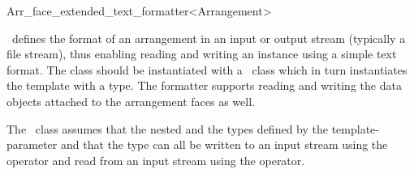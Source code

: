 
\ccRefPageBegin

\begin{ccRefClass}{Arr_face_extended_text_formatter<Arrangement>}

\ccDefinition

\ccRefName\ defines the format of an arrangement in an input or output stream
(typically a file stream), thus enabling reading and writing an 
instance using a simple text format. The  class should be
instantiated with a \dcel\ class which in turn instantiates the
 template with a  type.
The formatter supports reading and writing the data objects attached to the
arrangement faces as well.

The \ccRefName\ class assumes that the nested  and the  types
defined by the  template-parameter and that the  type
can all be written to an input stream using the \ccc{<<} operator and read from an input stream using the \ccc{>>} operator.


\ccIsModel
     \\

\ccSeeAlso
     \\
     \\

\end{ccRefClass}

\ccRefPageEnd

